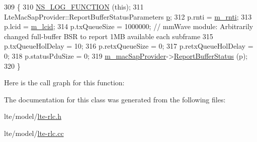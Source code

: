 \begin{DoxyCode}
309 \{
310   \hyperlink{log-macros-disabled_8h_a90b90d5bad1f39cb1b64923ea94c0761}{NS\_LOG\_FUNCTION} (\textcolor{keyword}{this});
311   LteMacSapProvider::ReportBufferStatusParameters \hyperlink{lte__link__budget_8m_ac9de518908a968428863f829398a4e62}{p};
312   p.rnti = \hyperlink{classns3_1_1LteRlc_a48ab0a78e7f2687337075b1c8832df70}{m\_rnti};
313   p.lcid = \hyperlink{classns3_1_1LteRlc_a051085e9b27883e7ba4b98ad7242fd8a}{m\_lcid};
314   p.txQueueSize = 1000000;  \textcolor{comment}{// mmWave module: Arbitrarily changed full-buffer BSR to report 1MB available
       each subframe}
315   p.txQueueHolDelay = 10;
316   p.retxQueueSize = 0;
317   p.retxQueueHolDelay = 0;
318   p.statusPduSize = 0;
319   \hyperlink{classns3_1_1LteRlc_a69272d17c4e48183bb89b8dd0660c1be}{m\_macSapProvider}->\hyperlink{classns3_1_1LteMacSapProvider_a9b871a79546b8d06debd925d8863d442}{ReportBufferStatus} (p);
320 \}
\end{DoxyCode}


Here is the call graph for this function\+:




The documentation for this class was generated from the following files\+:\begin{DoxyCompactItemize}
\item 
lte/model/\hyperlink{lte-rlc_8h}{lte-\/rlc.\+h}\item 
lte/model/\hyperlink{lte-rlc_8cc}{lte-\/rlc.\+cc}\end{DoxyCompactItemize}
